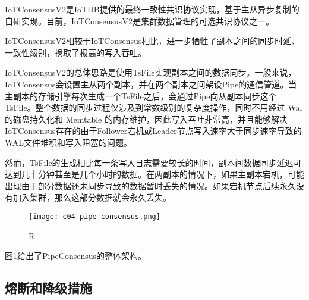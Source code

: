IoTConsensusV2是IoTDB提供的最终一致性共识协议实现，基于主从异步复制的自研实现。目前，IoTConsensusV2是集群数据管理的可选共识协议之一。

IoTConsensusV2相较于IoTConsensus相比，进一步牺牲了副本之间的同步时延、一致性级别，换取了极高的写入吞吐。

IoTConsensusV2的总体思路是使用TsFile实现副本之间的数据同步。一般来说，IoTConsensus会设置主从两个副本，并在两个副本之间架设Pipe的通信管道。当主副本的存储引擎每次生成一个TsFile之后，会通过Pipe向从副本同步这个TsFile。整个数据的同步过程仅涉及到常数级别的复杂度操作，同时不用经过 Wal 的磁盘持久化和 Memtable 的内存维护，因此写入吞吐非常高，并且能够解决IoTConsensus存在的由于Follower宕机或Leader节点写入速率大于同步速率导致的WAL文件堆积和写入阻塞的问题。


然而，TsFile的生成相比每一条写入日志需要较长的时间，副本间数据同步延迟可达到几十分钟甚至是几个小时的数据。在两副本的情况下，如果主副本宕机，可能出现由于部分数据还未同步导致的数据暂时丢失的情况。如果宕机节点后续永久没有加入集群，那么这部分数据就会永久丢失。


\begin{figure}
  \centering
  \texttt{[image: c04-pipe-consensus.png]}
  \caption{R}
  \label{fig:c04-pipe-consensus}
\end{figure}

图\ref{fig:c04-pipe-consensus}给出了PipeConsensus的整体架构。


\subsection{熔断和降级措施}



